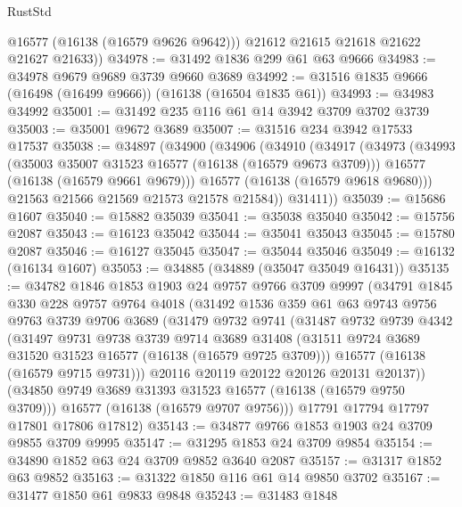 \begin{lexlean}{RustStd}
\begin{coremodule}
          @16577
          (@16138 (@16579 @9626 @9642)))
        @21612
        @21615
        @21618
        @21622
        @21627
        @21633))
@34978 := @31492 @1836 @299 @61 @63 @9666
@34983 := @34978 @9679 @9689 @3739 @9660 @3689
@34992 := @31516 @1835 @9666 (@16498 (@16499 @9666)) (@16138 (@16504 @1835 @61))
@34993 := @34983 @34992
@35001 := @31492 @235 @116 @61 @14 @3942 @3709 @3702 @3739
@35003 := @35001 @9672 @3689
@35007 := @31516 @234 @3942 @17533 @17537
@35038 := @34897
    (@34900
      (@34906
        (@34910
          (@34917
            (@34973
              (@34993
                (@35003 @35007 @31523 @16577 (@16138 (@16579 @9673 @3709)))
                @16577
                (@16138 (@16579 @9661 @9679)))
              @16577
              (@16138 (@16579 @9618 @9680)))
            @21563
            @21566
            @21569
            @21573
            @21578
            @21584))
        @31411))
@35039 := @15686 @1607
@35040 := @15882 @35039
@35041 := @35038 @35040
@35042 := @15756 @2087
@35043 := @16123 @35042
@35044 := @35041 @35043
@35045 := @15780 @2087
@35046 := @16127 @35045
@35047 := @35044 @35046
@35049 := @16132 (@16134 @1607)
@35053 := @34885 (@34889 (@35047 @35049 @16431))
@35135 := @34782
    @1846
    @1853
    @1903
    @24
    @9757
    @9766
    @3709
    @9997
    (@34791
      @1845
      @330
      @228
      @9757
      @9764
      @4018
      (@31492
        @1536
        @359
        @61
        @63
        @9743
        @9756
        @9763
        @3739
        @9706
        @3689
        (@31479
          @9732
          @9741
          (@31487
            @9732
            @9739
            @4342
            (@31497
              @9731
              @9738
              @3739
              @9714
              @3689
              @31408
              (@31511 @9724 @3689 @31520 @31523 @16577 (@16138 (@16579 @9725 @3709)))
              @16577
              (@16138 (@16579 @9715 @9731)))
            @20116
            @20119
            @20122
            @20126
            @20131
            @20137))
        (@34850 @9749 @3689 @31393 @31523 @16577 (@16138 (@16579 @9750 @3709)))
        @16577
        (@16138 (@16579 @9707 @9756)))
      @17791
      @17794
      @17797
      @17801
      @17806
      @17812)
@35143 := @34877 @9766 @1853 @1903 @24 @3709 @9855 @3709 @9995
@35147 := @31295 @1853 @24 @3709 @9854
@35154 := @34890 @1852 @63 @24 @3709 @9852 @3640 @2087
@35157 := @31317 @1852 @63 @9852
@35163 := @31322 @1850 @116 @61 @14 @9850 @3702
@35167 := @31477 @1850 @61 @9833 @9848
@35243 := @31483
    @1848

\end{coremodule}
\end{lexlean}
